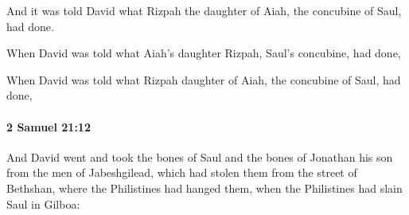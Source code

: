 			\begin{versebox}
					\item[BHS] 
					\item[ASV] And it was told David what Rizpah the daughter of Aiah, the concubine of Saul, had done.
					\item[NIV] When David was told what Aiah’s daughter Rizpah, Saul’s concubine, had done,
					\item[NRSV] When David was told what Rizpah daughter of Aiah, the concubine of Saul, had done,
			\end{versebox}

		\paragraph{2 Samuel 21:12} %
			\label{2SAMUEL-21-12}

			And David went and took the bones of Saul and the bones of Jonathan his son from the men of Jabeshgilead, which had stolen them from the street of Bethshan, where the Philistines had hanged them, when the Philistines had slain Saul in Gilboa:

